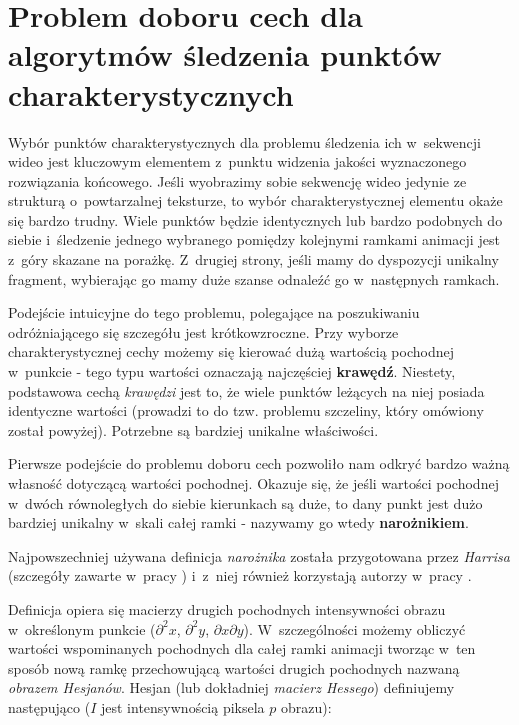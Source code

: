  \section{Problem doboru cech dla algorytmów śledzenia punktów charakterystycznych}\label{Section_GoodGeaturesToTrack}
    Wybór punktów charakterystycznych dla problemu śledzenia ich w~sekwencji wideo jest kluczowym elementem z~punktu widzenia jakości wyznaczonego rozwiązania końcowego. Jeśli wyobrazimy sobie sekwencję wideo jedynie ze strukturą o~powtarzalnej teksturze, to wybór charakterystycznej elementu okaże się bardzo trudny. Wiele punktów będzie identycznych lub bardzo podobnych do siebie i~śledzenie jednego wybranego pomiędzy kolejnymi ramkami animacji jest z~góry skazane na porażkę. Z~drugiej strony, jeśli mamy do dyspozycji unikalny fragment, wybierając go mamy duże szanse odnaleźć go w~następnych ramkach.

    Podejście intuicyjne do tego problemu, polegające na poszukiwaniu odróżniającego się szczegółu jest krótkowzroczne. Przy wyborze charakterystycznej cechy możemy się kierować dużą wartością pochodnej w~punkcie - tego typu wartości oznaczają najczęściej \textbf{krawędź}. Niestety, podstawowa cechą \textit{krawędzi} jest to, że wiele punktów leżących na niej posiada identyczne wartości (prowadzi to do tzw. problemu szczeliny, który omówiony został powyżej). Potrzebne są bardziej unikalne właściwości.

    Pierwsze podejście do problemu doboru cech pozwoliło nam odkryć bardzo ważną własność dotyczącą wartości pochodnej. Okazuje się, że jeśli wartości pochodnej w~dwóch równoległych do siebie kierunkach są duże, to dany punkt jest dużo bardziej unikalny w~skali całej ramki - nazywamy go wtedy \textbf{narożnikiem}.

    Najpowszechniej używana definicja \textit{narożnika} została przygotowana przez \textit{Harrisa} (szczegóły zawarte w~pracy \cite{Harris88}) i~z~niej również korzystają autorzy w~pracy \cite{GoodFeaturesToTrack94}.

    Definicja opiera się macierzy drugich pochodnych intensywności obrazu w~określonym punkcie ($\partial^2 x$, $\partial^2 y$, $\partial x\partial y$). W~szczególności możemy obliczyć wartości wspominanych pochodnych dla całej ramki animacji tworząc w~ten sposób nową ramkę przechowującą wartości drugich pochodnych nazwaną \textit{obrazem Hesjanów}. Hesjan (lub dokładniej \textit{macierz Hessego}) definiujemy następująco ($I$ jest intensywnością piksela $p$ obrazu):

